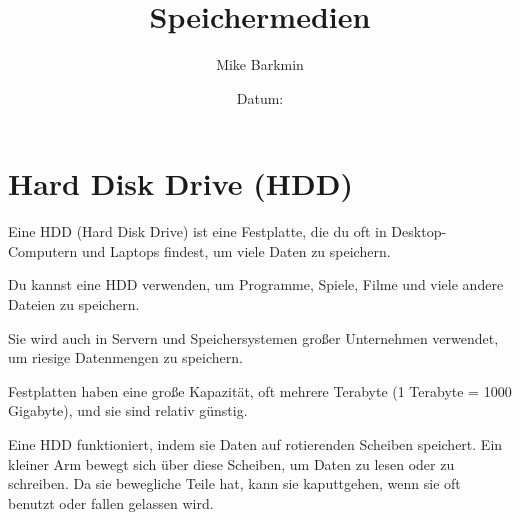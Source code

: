 \documentclass[a4paper,14pt]{scrartcl}
\title{Speichermedien}
\author{Mike Barkmin}
\date{Datum: \hspace{1.5cm}}
\begin{document}
\section*{ Hard Disk Drive (HDD)}

Eine HDD (Hard Disk Drive) ist eine Festplatte, die du oft in Desktop-Computern und Laptops findest, um viele Daten zu speichern. 

Du kannst eine HDD verwenden, um Programme, Spiele, Filme und viele andere Dateien zu speichern. 

Sie wird auch in Servern und Speichersystemen großer Unternehmen verwendet, um riesige Datenmengen zu speichern. 

Festplatten haben eine große Kapazität, oft mehrere Terabyte (1 Terabyte = 1000 Gigabyte), und sie sind relativ günstig.

Eine HDD funktioniert, indem sie Daten auf rotierenden Scheiben speichert. Ein kleiner Arm bewegt sich über diese Scheiben, um Daten zu lesen oder zu schreiben. Da sie bewegliche Teile hat, kann sie kaputtgehen, wenn sie oft benutzt oder fallen gelassen wird.
\end{document}
